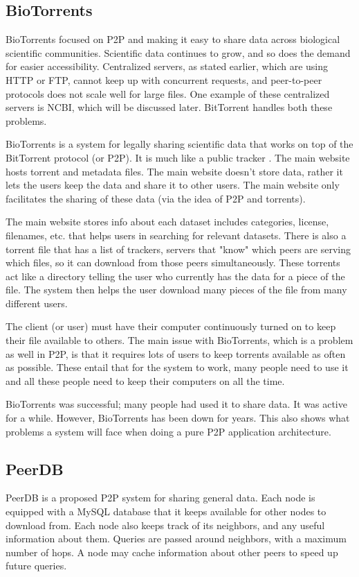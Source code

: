 \documentclass[acmsmall]{acmart}
\begin{document}
\begin{multicols}{2}
\subsection{BioTorrents}
BioTorrents focused on P2P and making it easy to share data across biological scientific communities. Scientific data continues to grow, and so does the demand for easier accessibility. Centralized servers, as stated earlier, which are using HTTP or FTP, cannot keep up with concurrent requests, and peer-to-peer protocols does not scale well for large files.\cite{biotorrents} One example of these centralized servers is NCBI, which will be discussed later. BitTorrent handles both these problems. 

BioTorrents is a system for legally sharing scientific data that works on top of the BitTorrent protocol (or P2P). It is much like a public tracker \cite{biotorrents}. The main website hosts torrent and metadata files. The main website doesn't store data, rather it lets the users keep the data and share it to other users. The main website only facilitates the sharing of these data (via the idea of P2P and torrents).

The main website stores info about each dataset includes categories, license, filenames, etc. that helps users in searching for relevant datasets. There is also a torrent file that has a list of trackers, servers that "know" which peers are serving which files, so it can download from those peers simultaneously. These torrents act like a directory telling the user who currently has the data for a piece of the file. The system then helps the user download many pieces of the file from many different users.

The client (or user) must have their computer continuously turned on to keep their file available to others. The main issue with BioTorrents, which is a problem as well in P2P, is that it requires lots of users to keep torrents available as often as possible.\cite{biotorrents} These entail that for the system to work, many people need to use it and all these people need to keep their computers on all the time.

BioTorrents was successful; many people had used it to share data. It was active for a while. However, BioTorrents has been down for years. This also shows what problems a system will face when doing a pure P2P application architecture.

\subsection{PeerDB}
PeerDB is a proposed P2P system for sharing general data. Each node is equipped with a MySQL database that it keeps available for other nodes to download from. Each node also keeps track of its neighbors, and any useful information about them. Queries are passed around neighbors, with a maximum number of hops. A node may cache information about other peers to speed up future queries.
\cite{peerdb}


\end{multicols}
\end{document}
